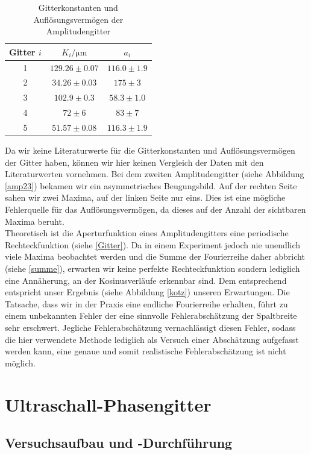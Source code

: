 \documentclass[12pt]{article}
\begin{document}
\begin{table}[h!]
	\centering
	\begin{tabular}{c|c|c}
		Gitter $i$&$K_i / \mathrm{\mu m}$&$a_i$\\\hline
		1&$129.26\pm0.07$&$116.0\pm1.9$\\
		2&$ 34.26\pm0.03$&$175  \pm3  $\\
		3&$102.9 \pm0.3 $&$ 58.3\pm1.0$\\
		4&$ 72   \pm6   $&$ 83  \pm7  $\\
		5&$ 51.57\pm0.08$&$116.3\pm1.9$		
	\end{tabular}
	\caption{\label{ergebnisse}Gitterkonstanten und Auflösungsvermögen der Amplitudengitter}
\end{table}

Da wir keine Literaturwerte für die Gitterkonstanten und Auflösungsvermögen der Gitter haben, können wir hier keinen Vergleich der Daten mit den Literaturwerten vornehmen. Bei dem zweiten Amplitudengitter (siehe Abbildung \ref{amp23}) bekamen wir ein asymmetrisches Beugungsbild. Auf der rechten Seite sahen wir zwei Maxima, auf der linken Seite nur eins. Dies ist eine mögliche Fehlerquelle für das Auflösungsvermögen, da dieses auf der Anzahl der sichtbaren Maxima beruht.\\

Theoretisch ist die Aperturfunktion eines Amplitudengitters eine periodische Rechteckfunktion (siehe \ref{Gitter}). Da in einem Experiment jedoch nie unendlich viele Maxima beobachtet werden und die Summe der Fourierreihe daher abbricht (siehe \ref{summe}), erwarten wir keine perfekte Rechteckfunktion sondern lediglich eine Annäherung, an der Kosinusverläufe erkennbar sind. Dem entsprechend entspricht unser Ergebnis (siehe Abbildung \ref{kotz}) unseren Erwartungen. Die Tatsache, dass wir in der Praxis eine endliche Fourierreihe erhalten, führt zu einem unbekannten Fehler der eine sinnvolle Fehlerabschätzung der Spaltbreite sehr erschwert. Jegliche Fehlerabschätzung vernachlässigt diesen Fehler, sodass die hier verwendete Methode lediglich als Versuch einer Abschätzung aufgefasst werden kann, eine genaue und somit realistische Fehlerabschätzung ist nicht möglich.
\newpage
\section{Ultraschall-Phasengitter}


\subsection{Versuchsaufbau und -Durchführung}
\end{document}
